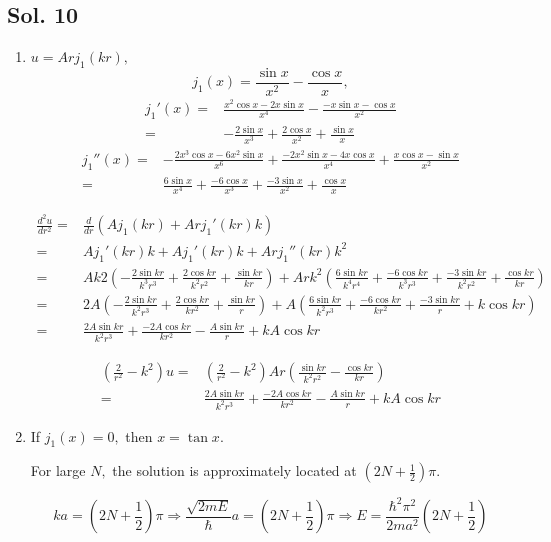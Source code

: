 \subsection*{Sol. 10}
\begin{enumerate}
    \item 
    $u=Arj_1(kr),$ 
    $$j_1(x)=\frac{\sin x}{x^2}-\frac{\cos x}{x},$$
    \begin{align*}
    j_1'(x)=&\frac{x^2\cos x-2x\sin x }{x^4}-\frac{-x\sin x-\cos x}{x^2}\\
    =&-\frac{2\sin x}{x^3} + 
    \frac{2\cos x}{x^2} + \frac{\sin x}{x}
    \end{align*}
    \begin{align*}
        j_1''(x)
        =& 
        -\frac{2x^3\cos x-6x^2\sin x}{x^6}
        +\frac{-2x^2\sin x-4x\cos x}{x^4}
        +
        \frac{x\cos x-\sin x}{x^2}\\
        =&\frac{6\sin x}{x^4} + 
        \frac{-6\cos x}{x^3} + 
        \frac{-3\sin x}{x^2} + 
        \frac{\cos x}{x}
    \end{align*}

    \begin{align*}
        \frac{d^2u}{dr^2}
        =&
        \frac{d}{dr}
        (Aj_1(kr)+Arj_1'(kr)k)\\
        =&Aj_1'(kr)k + 
        Aj_1'(kr)k + 
        Arj_1''(kr)k^2\\
        =&
        Ak2
        \left(-\frac{2\sin kr}{k^3r^3} + 
    \frac{2\cos kr}{k^2r^2} + 
    \frac{\sin kr}{kr}
    \right)
    +Ark^2\left(
    \frac{6\sin kr}{k^4r^4} + 
        \frac{-6\cos kr}{k^3r^3} + 
        \frac{-3\sin kr}{k^2r^2} + 
        \frac{\cos kr}{kr}
    \right)\\
    =&
    2A
    \left(-\frac{2\sin kr}{k^2r^3} + 
    \frac{2\cos kr}{kr^2} + 
    \frac{\sin kr}{r}
    \right) + 
    A\left(
    \frac{6\sin kr}{k^2r^3} + 
        \frac{-6\cos kr}{kr^2} + 
        \frac{-3\sin kr}{r} + 
        k\cos kr
    \right)\\
    =&\frac{2A\sin kr}{k^2r^3}
    +\frac{-2A\cos kr}{kr^2}
    -\frac{A\sin kr}{r}
    +kA\cos kr
    \end{align*}

    \begin{align*}
        (\frac{2}{r^2}-k^2)u
        =&(\frac{2}{r^2}-k^2)Ar(\frac{\sin kr}{k^2r^2}-\frac{\cos kr}{kr})\\
        =&
        \frac{2A\sin kr}{k^2r^3}
    +\frac{-2A\cos kr}{kr^2}
    -\frac{A\sin kr}{r}
    +kA\cos kr
    \end{align*}

    \item 
    If $j_1(x)=0,$ then $x=\tan x.$ 
    
    
    For large $N,$ the solution is approximately located at 
    $(2N+\frac{1}{2})\pi.$

    $$
    ka = (2N+\frac{1}{2})\pi\Rightarrow
    \frac{\sqrt{2mE}}{\hbar}a=(2N+\frac{1}{2})\pi
    \Rightarrow 
    E = \frac{\hbar^2\pi^2}{2ma^2}(2N+\frac{1}{2})
    $$
    
\end{enumerate}

